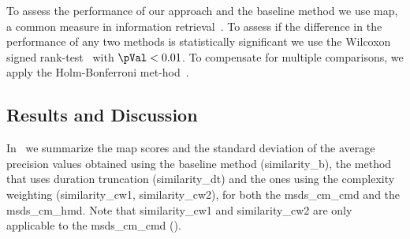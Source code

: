 To assess the performance of our approach and the baseline method we use \acrfull{map}, a common measure in information retrieval~\citep{manning2008introduction}. To assess if the difference in the performance of any two methods is statistically significant we use the Wilcoxon signed rank-test~\citep{wilcoxon1945individual} with $\pVal < 0.01$. To compensate for multiple comparisons, we apply the Holm-Bonferroni met-hod~\citep{holm1979simple}.


\subsection{Results and Discussion}
\label{sec:patterns_improving_similarity_results_and_discussion}


In~ we summarize the \gls{map} scores and the standard deviation of the average precision values obtained using the baseline method (\acrshort{similarity_b}), the method that uses duration truncation (\acrshort{similarity_dt}) and the ones using the complexity weighting (\acrshort{similarity_cw1}, \acrshort{similarity_cw2}), for both the \acrshort{msds_cm_cmd} and the \acrshort{msds_cm_hmd}. Note that \acrshort{similarity_cw1} and \acrshort{similarity_cw2} are only applicable to the \acrshort{msds_cm_cmd} ().


